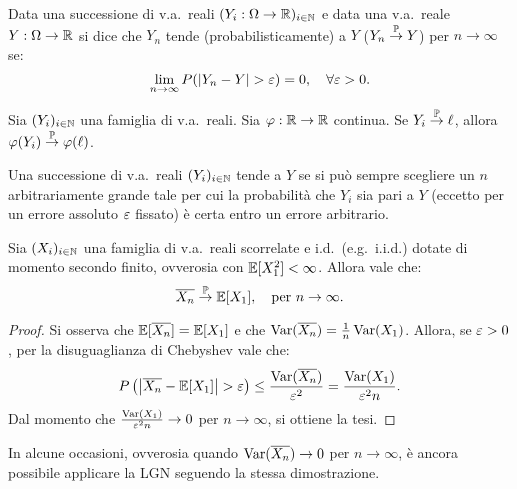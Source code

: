 \begin{multicols*}{2}
\begin{definition}
    Data una successione di v.a.~reali $(Y_i : \Omega \to \mathbb{R})_{i \in \mathbb{N}}$ e data
    una v.a.~reale $Y : \Omega \to \mathbb{R}$ si
    dice che $Y_n$ tende (probabilisticamente) a $Y$ ($Y_n \overset{\mathbb{P}}{\to} Y$) per $n \to \infty$
    se:
    \[
        \lim_{n \to \infty} P(\left\lvert Y_n - Y \right\rvert > \varepsilon) = 0, \quad \forall \varepsilon > 0.
    \]
\end{definition}

\begin{lemma}
    Sia $(Y_i)_{i \in \mathbb{N}}$ una famiglia di v.a.~reali. Sia $\varphi : \mathbb{R} \to \mathbb{R}$
    continua. Se $Y_i \overset{\mathbb{P}}{\to} \ell$, allora $\varphi(Y_i) \overset{\mathbb{P}}{\to} \varphi(\ell)$.
\end{lemma}

\begin{remark}
    Una successione di v.a.~reali $(Y_i)_{i \in \mathbb{N}}$ tende a $Y$ se si può
    sempre scegliere un $n$ arbitrariamente grande tale per cui la probabilità che $Y_i$
    sia pari a $Y$ (eccetto per un errore assoluto $\varepsilon$ fissato) è certa entro un
    errore arbitrario.
\end{remark}

\begin{theorem}
    Sia $(X_i)_{i \in \mathbb{N}}$ una famiglia di v.a.~reali scorrelate e i.d.~(e.g.~i.i.d.) dotate di momento secondo
    finito, ovverosia con $\mathbb{E}[X_1^2] < \infty$. Allora vale che:
    \[
        \overline{X_n} \overset{\mathbb{P}}{\to} \mathbb{E}[X_1], \quad \text{per } n \to \infty.
    \]
\end{theorem}

\begin{proof}
    Si osserva che $\mathbb{E}[\overline{X_n}] = \mathbb{E}[X_1]$ e che
    $\operatorname{Var}(\overline{X_n}) = \frac{1}{n} \operatorname{Var}(X_1)$. Allora, se $\varepsilon > 0$,
    per la disuguaglianza di Chebyshev vale che:
    \[
        P\left(\left\lvert \overline{X_n} - \mathbb{E}[X_1] \right\rvert > \varepsilon\right) \leq \frac{\operatorname{Var}(\overline{X_n})}{\varepsilon^2} =
        \frac{\operatorname{Var}(X_1)}{\varepsilon^2 n}.
    \]
    Dal momento che $\frac{\operatorname{Var}(X_1)}{\varepsilon^2 n} \to 0$ per $n \to \infty$, si ottiene
    la tesi.
\end{proof}

\begin{remark}
    In alcune occasioni, ovverosia quando $\operatorname{Var}(\overline{X_n}) \to 0$
    per $n \to \infty$, è ancora possibile applicare la LGN seguendo la stessa
    dimostrazione.
\end{remark}


\end{multicols*}
